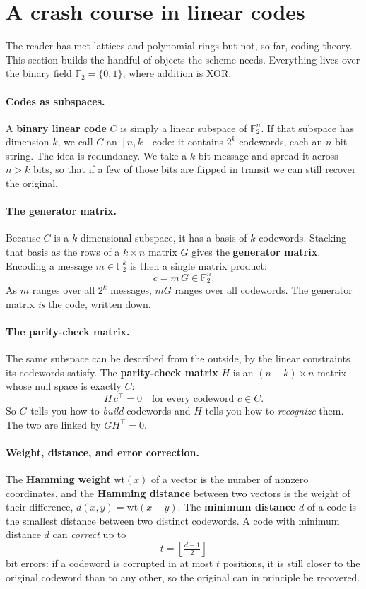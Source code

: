 \section{A crash course in linear codes}

The reader has met lattices and polynomial rings but not, so far, coding theory. This section builds the handful of objects the scheme needs. Everything lives over the binary field $\mathbb{F}_2 = \{0,1\}$, where addition is XOR.

\paragraph{Codes as subspaces.}
A \textbf{binary linear code} $C$ is simply a linear subspace of $\mathbb{F}_2^n$. If that subspace has dimension $k$, we call $C$ an $[n,k]$ code: it contains $2^k$ codewords, each an $n$-bit string. The idea is redundancy. We take a $k$-bit message and spread it across $n > k$ bits, so that if a few of those bits are flipped in transit we can still recover the original.

\paragraph{The generator matrix.}
Because $C$ is a $k$-dimensional subspace, it has a basis of $k$ codewords. Stacking that basis as the rows of a $k \times n$ matrix $G$ gives the \textbf{generator matrix}. Encoding a message $m \in \mathbb{F}_2^k$ is then a single matrix product:
\[
c = m\,G \in \mathbb{F}_2^n .
\]
As $m$ ranges over all $2^k$ messages, $mG$ ranges over all codewords. The generator matrix \emph{is} the code, written down.

\paragraph{The parity-check matrix.}
The same subspace can be described from the outside, by the linear constraints its codewords satisfy. The \textbf{parity-check matrix} $H$ is an $(n-k) \times n$ matrix whose null space is exactly $C$:
\[
H\,c^\top = 0 \quad\text{for every codeword } c \in C .
\]
So $G$ tells you how to \emph{build} codewords and $H$ tells you how to \emph{recognize} them. The two are linked by $G H^\top = 0$.

\paragraph{Weight, distance, and error correction.}
The \textbf{Hamming weight} $\mathrm{wt}(x)$ of a vector is the number of nonzero coordinates, and the \textbf{Hamming distance} between two vectors is the weight of their difference, $d(x,y) = \mathrm{wt}(x-y)$. The \textbf{minimum distance} $d$ of a code is the smallest distance between two distinct codewords. A code with minimum distance $d$ can \emph{correct} up to
\[
t = \left\lfloor \tfrac{d-1}{2} \right\rfloor
\]
bit errors: if a codeword is corrupted in at most $t$ positions, it is still closer to the original codeword than to any other, so the original can in principle be recovered.

